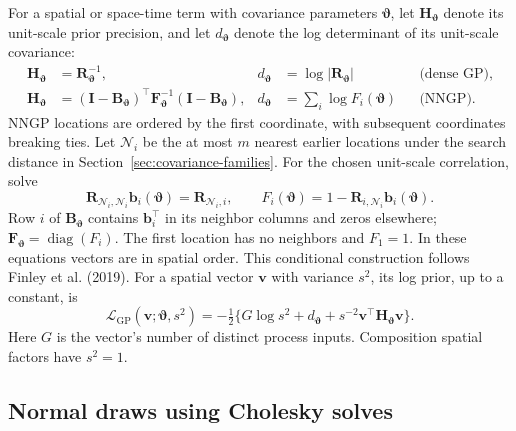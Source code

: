 \documentclass[11pt]{article}
\newcommand{\bb}{\bm{b}}
\newcommand{\bv}{\bm{v}}
\newcommand{\bB}{\bm{B}}
\newcommand{\bF}{\bm{F}}
\newcommand{\bI}{\bm{I}}
\newcommand{\bR}{\bm{R}}
\newcommand{\bH}{\bm{H}}
\newcommand{\trans}{^\top}
\begin{document}
For a spatial or space-time term with covariance parameters \(\boldsymbol\vartheta\), let \(\bH_{\boldsymbol\vartheta}\) denote its unit-scale prior precision,
and let \(d_{\boldsymbol\vartheta}\) denote the log determinant of its unit-scale covariance:
\begin{equation}
 \begin{aligned}
  \bH_{\boldsymbol\vartheta}&=\bR_{\boldsymbol\vartheta}^{-1}, &d_{\boldsymbol\vartheta}&=\log|\bR_{\boldsymbol\vartheta}| &&\text{(dense GP)},\\
  \bH_{\boldsymbol\vartheta}&=(\bI-\bB_{\boldsymbol\vartheta})\trans\bF_{\boldsymbol\vartheta}^{-1}(\bI-\bB_{\boldsymbol\vartheta}),
  &d_{\boldsymbol\vartheta}&=\sum_i\log F_i(\boldsymbol\vartheta) &&\text{(NNGP)}.
 \end{aligned}
 \label{eq:spatial-precision}
\end{equation}
NNGP locations are ordered by the first coordinate, with subsequent coordinates
breaking ties. Let \(\mathcal N_i\) be the at most \(m\) nearest earlier
locations under the search distance in Section~\ref{sec:covariance-families}. For the chosen unit-scale correlation, solve
\begin{equation}
  \bR_{\mathcal N_i,\mathcal N_i}\bb_i(\boldsymbol\vartheta)
                    =\bR_{\mathcal N_i,i},\qquad
  F_i(\boldsymbol\vartheta)=1-\bR_{i,\mathcal N_i}\bb_i(\boldsymbol\vartheta).
  \label{eq:nngp-conditional-parallel}
\end{equation}
Row \(i\) of \(\bB_{\boldsymbol\vartheta}\) contains \(\bb_i\trans\) in its neighbor
columns and zeros elsewhere; \(\bF_{\boldsymbol\vartheta}=\operatorname{diag}(F_i)\).
The first location has no neighbors and \(F_1=1\). In these equations vectors
are in spatial order. This conditional construction follows Finley et al. (2019).
For a spatial vector \(\bv\) with variance \(s^2\), its log prior, up to a
constant, is
\begin{equation}
  \mathcal L_{\mathrm{GP}}(\bv;\boldsymbol\vartheta,s^2)
  =-\tfrac12\{G\log s^2+d_{\boldsymbol\vartheta}+s^{-2}\bv\trans\bH_{\boldsymbol\vartheta}\bv\}.
  \label{eq:spatial-log-prior}
\end{equation}
Here \(G\) is the vector's number of distinct process inputs. Composition spatial
factors have \(s^2=1\).

\subsection{Normal draws using Cholesky solves}
\label{sec:normal-draws}
\end{document}

